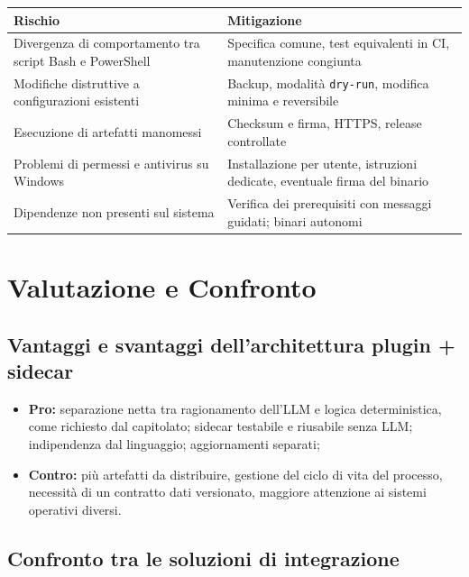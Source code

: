 \documentclass[a4paper, 11pt]{article}
\begin{document}
\vspace{0.3cm}
\noindent
\begin{tabularx}{\textwidth}{|X|X|}
    \hline
    \textbf{Rischio} & \textbf{Mitigazione} \\ \hline
    Divergenza di comportamento tra script Bash e PowerShell & Specifica comune, test equivalenti in CI, manutenzione congiunta \\ \hline
    Modifiche distruttive a configurazioni esistenti & Backup, modalità \texttt{dry-run}, modifica minima e reversibile \\ \hline
    Esecuzione di artefatti manomessi & Checksum e firma, HTTPS, release controllate \\ \hline
    Problemi di permessi e antivirus su Windows & Installazione per utente, istruzioni dedicate, eventuale firma del binario \\ \hline
    Dipendenze non presenti sul sistema & Verifica dei prerequisiti con messaggi guidati; binari autonomi \\ \hline
\end{tabularx}
\vspace{0.3cm}


\section{Valutazione e Confronto}

\subsection{Vantaggi e svantaggi dell'architettura plugin + sidecar}
\begin{itemize}
    \item \textbf{Pro:} separazione netta tra ragionamento dell'LLM e logica deterministica, come richiesto dal capitolato; sidecar testabile e riusabile senza LLM; indipendenza dal linguaggio; aggiornamenti separati;
    \item \textbf{Contro:} più artefatti da distribuire, gestione del ciclo di vita del processo, necessità di un contratto dati versionato, maggiore attenzione ai sistemi operativi diversi.
\end{itemize}

\subsection{Confronto tra le soluzioni di integrazione}
\end{document}

